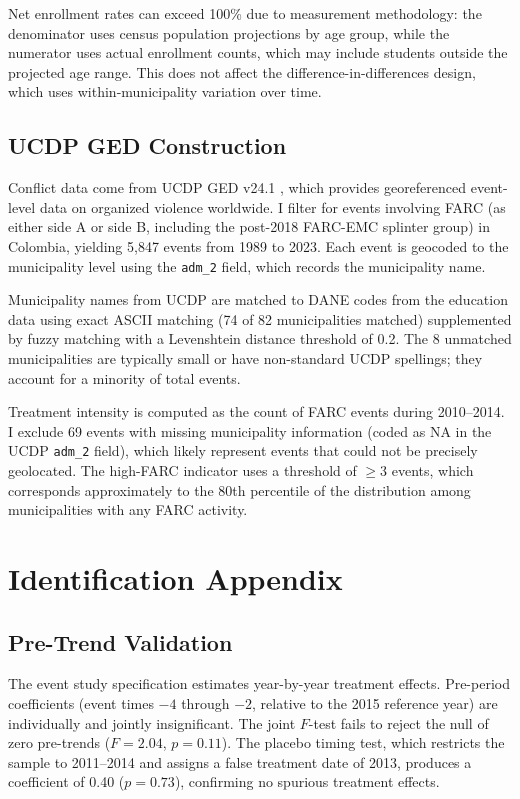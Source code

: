 \documentclass[12pt]{article}
\begin{document}
Net enrollment rates can exceed 100\% due to measurement methodology: the denominator uses census population projections by age group, while the numerator uses actual enrollment counts, which may include students outside the projected age range. This does not affect the difference-in-differences design, which uses within-municipality variation over time.

\subsection{UCDP GED Construction}

Conflict data come from UCDP GED v24.1 \citep{sundberg2013introducing}, which provides georeferenced event-level data on organized violence worldwide. I filter for events involving FARC (as either side A or side B, including the post-2018 FARC-EMC splinter group) in Colombia, yielding 5,847 events from 1989 to 2023. Each event is geocoded to the municipality level using the \texttt{adm\_2} field, which records the municipality name.

Municipality names from UCDP are matched to DANE codes from the education data using exact ASCII matching (74 of 82 municipalities matched) supplemented by fuzzy matching with a Levenshtein distance threshold of 0.2. The 8 unmatched municipalities are typically small or have non-standard UCDP spellings; they account for a minority of total events.

Treatment intensity is computed as the count of FARC events during 2010--2014. I exclude 69 events with missing municipality information (coded as NA in the UCDP \texttt{adm\_2} field), which likely represent events that could not be precisely geolocated. The high-FARC indicator uses a threshold of $\geq$3 events, which corresponds approximately to the 80th percentile of the distribution among municipalities with any FARC activity.


\section{Identification Appendix}
\label{sec:id_appendix}

\subsection{Pre-Trend Validation}

The event study specification estimates year-by-year treatment effects. Pre-period coefficients (event times $-4$ through $-2$, relative to the 2015 reference year) are individually and jointly insignificant. The joint $F$-test fails to reject the null of zero pre-trends ($F=2.04$, $p=0.11$). The placebo timing test, which restricts the sample to 2011--2014 and assigns a false treatment date of 2013, produces a coefficient of 0.40 ($p=0.73$), confirming no spurious treatment effects.
\end{document}

